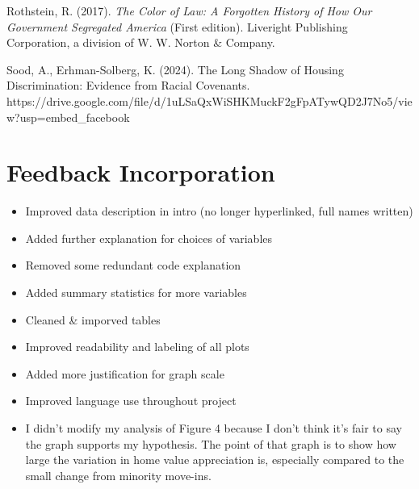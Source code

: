 \documentclass[11pt]{article}
\providecommand{\tightlist}{%
      \setlength{\itemsep}{0pt}\setlength{\parskip}{0pt}}
\begin{document}
Rothstein, R. (2017). \emph{The Color of Law: A Forgotten History of How
Our Government Segregated America} (First edition). Liveright Publishing
Corporation, a division of W. W. Norton \& Company.

Sood, A., Erhman-Solberg, K. (2024). The Long Shadow of Housing
Discrimination: Evidence from Racial Covenants.
https://drive.google.com/file/d/1uLSaQxWiSHKMuckF2gFpATywQD2J7No5/view?usp=embed\_facebook
\appendix

    \section{Feedback Incorporation}\label{feedback-incorporation}

    \begin{itemize}
\tightlist
\item
  Improved data description in intro (no longer hyperlinked, full names
  written)
\item
  Added further explanation for choices of variables
\item
  Removed some redundant code explanation
\item
  Added summary statistics for more variables
\item
  Cleaned \& imporved tables
\item
  Improved readability and labeling of all plots
\item
  Added more justification for graph scale
\item
  Improved language use throughout project
\item
  I didn't modify my analysis of Figure 4 because I don't think it's
  fair to say the graph supports my hypothesis. The point of that graph
  is to show how large the variation in home value appreciation is,
  especially compared to the small change from minority move-ins.
\end{itemize}


    
    
    
\end{document}
